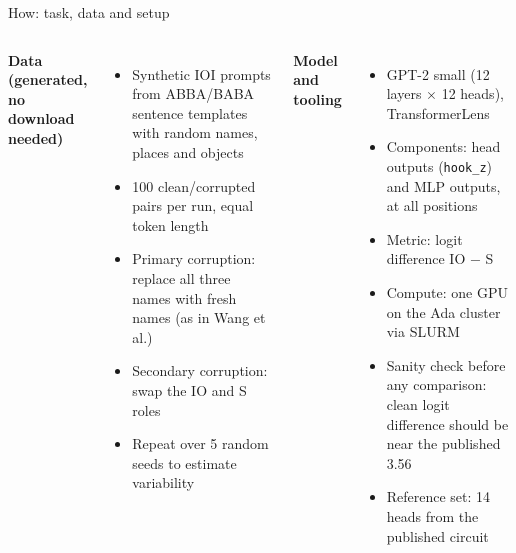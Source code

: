 \documentclass[aspectratio=169,10pt]{beamer}
\begin{document}
\begin{frame}{How: task, data and setup}
\begin{columns}[T]
\textbf{Data (generated, no download needed)}
\begin{itemize}
\item Synthetic IOI prompts from ABBA/BABA sentence templates with random names, places and objects
\item 100 clean/corrupted pairs per run, equal token length
\item Primary corruption: replace all three names with fresh names (as in Wang et al.)
\item Secondary corruption: swap the IO and S roles
\item Repeat over 5 random seeds to estimate variability
\end{itemize}
\textbf{Model and tooling}
\begin{itemize}
\item GPT-2 small (12 layers $\times$ 12 heads), TransformerLens
\item Components: head outputs (\texttt{hook\_z}) and MLP outputs, at all positions
\item Metric: logit difference IO $-$ S
\item Compute: one GPU on the Ada cluster via SLURM
\item Sanity check before any comparison: clean logit difference should be near the published 3.56
\item Reference set: 14 heads from the published circuit
\end{itemize}
\end{columns}
\end{frame}
\end{document}
